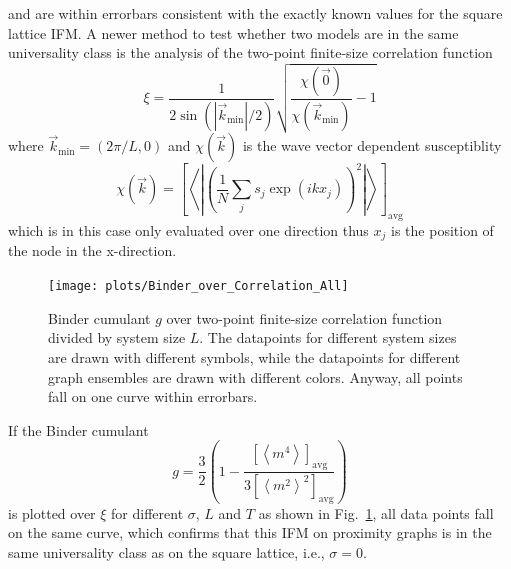 \documentclass[pre,twocolumn,groupedaddress,showpacs,showkeys,amsmath,amssymb,floatfix]{revtex4-1}
\newcommand{\avg}[1]{\ensuremath{\left< #1 \right>}}
\newcommand{\avgR}[1]{\ensuremath{\left[ #1 \right] _{\mathrm{avg}}}}
\newcommand{\abs}[1]{\ensuremath{\left\vert#1\right\vert}}
\newcommand{\brac}[1]{\ensuremath{\left(#1\right)}}
\begin{document}
        and are within errorbars consistent with the exactly known values for the
        square lattice IFM.
        A newer method \cite{chiCollapse,Hartmann2013} to test whether two models are in
        the same universality class is the analysis of the two-point finite-size
        correlation function
        \[\xi = \frac{1}{2\sin\brac{\abs{\vec{k}_{\mathrm{min}}}/2}} \sqrt{\frac{\chi(\vec{0})}{\chi(\vec{k}_{\mathrm{min}})} - 1}\]
        where $\vec{k}_{\mathrm{min}}=(2\pi / L, 0)$ and $\chi(\vec{k})$ is the wave vector
        dependent susceptiblity
        \[\chi(\vec{k}) = \avgR{\avg{\abs{\brac{\frac{1}{N}\sum_j s_j \exp(ikx_j)}^2}}}\]
        which is in this case only evaluated over one direction thus $x_j$ is the
        position of the node in the x-direction.

        \begin{figure}[htbp]
            \centering
            \texttt{[image: plots/Binder\_over\_Correlation\_All]}
            \caption[Binder cumulant over two-point finite-size correlation function divided by system size]
            {
                Binder cumulant $g$ over two-point finite-size correlation function
                divided by system size $L$. The datapoints for different system sizes
                are drawn with different symbols, while the datapoints for different
                graph ensembles are drawn with different colors. Anyway, all points
                fall on one curve within errorbars.
            }
            \label{fig:binderOverCorr}
        \end{figure}
        If the Binder cumulant
        \[g = \frac{3}{2}\brac{1-\frac{\avgR{\avg{m^4}}}{3\avgR{\avg{m^2}^2}}}\]
        is plotted over $\xi$ for different $\sigma$, $L$ and $T$ as shown in
        Fig.~\ref{fig:binderOverCorr}, all data points fall on the
        same curve, which confirms that this IFM on proximity graphs is in the
        same universality class as on the square lattice, i.e., $\sigma=0$.
\end{document}
